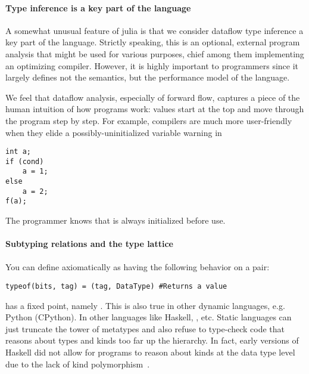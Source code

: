 



\paragraph{Type inference is a key part of the language}
A somewhat unusual feature of julia is that we consider dataflow type inference a
key part of the language. Strictly speaking, this is an optional, external program
analysis that might be used for various purposes, chief among them implementing
an optimizing compiler. However, it is highly important to programmers since it
largely defines not the semantics, but the performance model of the language.

We feel that dataflow analysis, especially of forward flow, captures a piece of
the human intuition of how programs work: values start at the top and move through
the program step by step. For example, compilers are much more user-friendly
when they elide a possibly-uninitialized variable warning in

\begin{verbatim}
int a;
if (cond)
    a = 1;
else
    a = 2;
f(a);
\end{verbatim}

The programmer knows that  is always initialized before use.

\paragraph{Subtyping relations and the type lattice}

\paragraph{}

You can define  axiomatically as having the following behavior on a  pair:

\begin{verbatim}
typeof(bits, tag) = (tag, DataType) #Returns a value
\end{verbatim}

 has a fixed point, namely . This is also true in other dynamic languages, e.g. Python (CPython). In other languages like Haskell, , etc. Static languages can just truncate the tower of metatypes and also refuse to type-check code that reasons about types and kinds too far up the hierarchy. In fact, early versions of Haskell did not allow for programs to reason about kinds at the data type level due to the lack of kind polymorphism~\cite{haskellkindtypes}.

